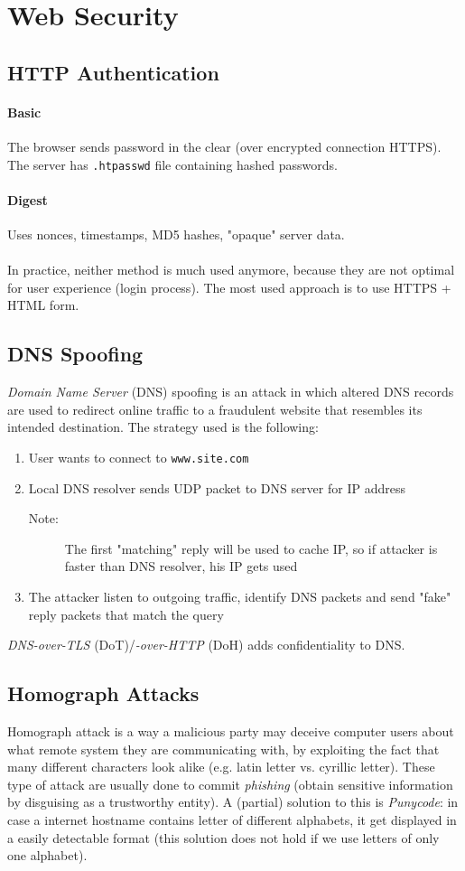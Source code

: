 \section{Web Security}
\subsection{HTTP Authentication}
\paragraph{Basic}
The browser sends password in the clear (over encrypted connection HTTPS). The server has \texttt{.htpasswd} file containing hashed passwords.
\paragraph{Digest}
Uses nonces, timestamps, MD5 hashes, "opaque" server data.\\\\
In practice, neither method is much used anymore, because they are not optimal for user experience (login process). The most used approach is to use HTTPS + HTML form.

\subsection{DNS Spoofing}
\textit{Domain Name Server} (DNS) spoofing is an attack in which altered DNS records are used to redirect online traffic to a fraudulent website that resembles its intended destination. The strategy used is the following:
\begin{enumerate}
    \item User wants to connect to \texttt{www.site.com}
    \item Local DNS resolver sends UDP packet to DNS server for IP address
    \begin{description}
    \item[Note:] The first "matching" reply will be used to cache IP, so if attacker is faster than DNS resolver, his IP gets used
    \end{description}
    \item The attacker listen to outgoing traffic, identify DNS packets and send "fake" reply packets that match the query
\end{enumerate}
\textit{DNS-over-TLS} (DoT)/\textit{-over-HTTP} (DoH) adds confidentiality to DNS.

\subsection{Homograph Attacks}
Homograph attack is a way a malicious party may deceive computer users about what remote system they are communicating with, by exploiting the fact that many different characters look alike (e.g. latin letter vs. cyrillic letter). These type of attack are usually done to commit \textit{phishing} (obtain sensitive information by disguising as a trustworthy entity). A (partial) solution to this is \textit{Punycode}: in case a internet hostname contains letter of different alphabets, it get displayed in a easily detectable format (this solution does not hold if we use letters of only one alphabet).


